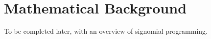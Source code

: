\section{Mathematical Background}
\label{sec:math}

To be completed later, with an overview of signomial programming.
